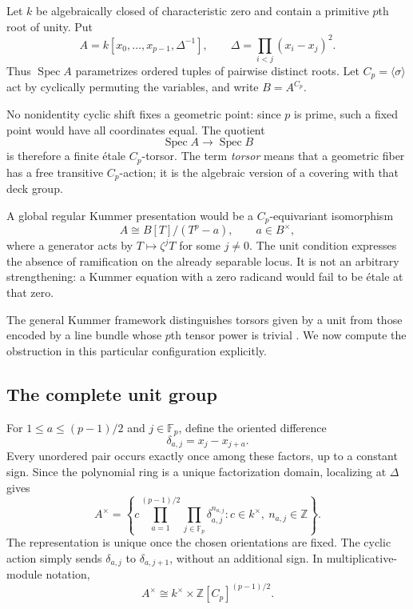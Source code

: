 \documentclass[11pt,a4paper]{article}
\theoremstyle{definition}
\theoremstyle{remark}
\newcommand{\Z}{\mathbb Z}
\newcommand{\F}{\mathbb F}
\newcommand{\Spec}{\operatorname{Spec}}
\begin{document}
Let $k$ be algebraically closed of characteristic zero and contain a
primitive $p$th root of unity. Put
\begin{equation}
 A=k[x_0,\ldots,x_{p-1},\Delta^{-1}],\qquad
 \Delta=\prod_{i<j}(x_i-x_j)^2.
 \label{eq:configuration}
\end{equation}
Thus $\Spec A$ parametrizes ordered tuples of pairwise distinct roots.
Let $C_p=\langle\sigma\rangle$ act by cyclically permuting the variables,
and write $B=A^{C_p}$.

No nonidentity cyclic shift fixes a geometric point: since $p$ is prime,
such a fixed point would have all coordinates equal. The quotient
\[
 \Spec A\longrightarrow\Spec B
\]
is therefore a finite \'etale $C_p$-torsor. The term \emph{torsor} means that
a geometric fiber has a free transitive $C_p$-action; it is the algebraic
version of a covering with that deck group.

A global regular Kummer presentation would be a $C_p$-equivariant
isomorphism
\begin{equation}
 A\cong B[T]/(T^p-a),\qquad a\in B^\times,
 \label{eq:globalKummer}
\end{equation}
where a generator acts by $T\mapsto\zeta^jT$ for some $j\neq0$.
The unit condition expresses the absence of ramification on the already
separable locus. It is not an arbitrary strengthening: a Kummer equation
with a zero radicand would fail to be \'etale at that zero.

The general Kummer framework distinguishes torsors given by a unit from
those encoded by a line bundle whose $p$th tensor power is trivial
\cite{StacksKummer}. We now compute the obstruction in this particular
configuration explicitly.

\subsection{The complete unit group}

For $1\leq a\leq(p-1)/2$ and $j\in\F_p$, define the oriented difference
\[
 \delta_{a,j}=x_j-x_{j+a}.
\]
Every unordered pair occurs exactly once among these factors, up to a
constant sign. Since the polynomial ring is a unique factorization domain,
localizing at $\Delta$ gives
\begin{equation}
 A^\times=
 \left\{c\prod_{a=1}^{(p-1)/2}\prod_{j\in\F_p}
          \delta_{a,j}^{n_{a,j}}:
       c\in k^\times,\ n_{a,j}\in\Z\right\}.
 \label{eq:units}
\end{equation}
The representation is unique once the chosen orientations are fixed.
The cyclic action simply sends $\delta_{a,j}$ to $\delta_{a,j+1}$, without
an additional sign. In multiplicative-module notation,
\begin{equation}
 A^\times\cong k^\times\times
                \Z[C_p]^{(p-1)/2}.
 \label{eq:unitmodule}
\end{equation}
\end{document}
